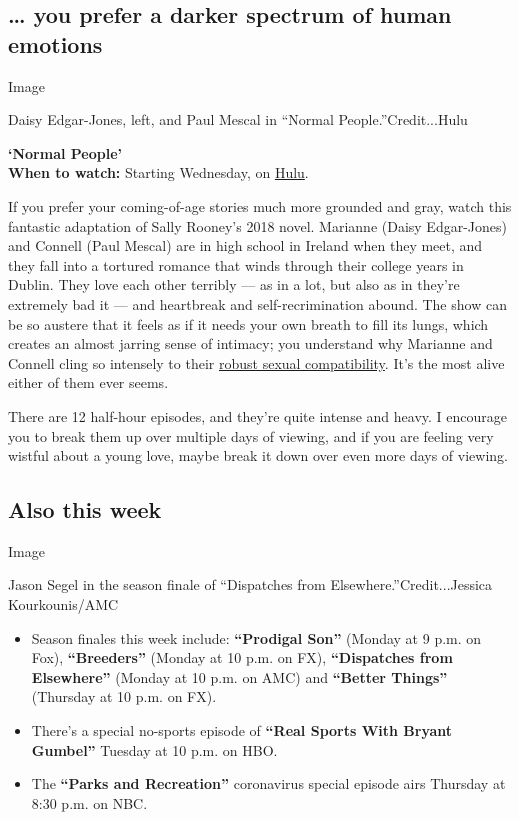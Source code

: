 \hypertarget{-you-prefer-a-darker-spectrum-of-human-emotions}{%
\subsection{\ldots{} you prefer a darker spectrum of human
emotions}\label{-you-prefer-a-darker-spectrum-of-human-emotions}}

Image

Daisy Edgar-Jones, left, and Paul Mescal in ``Normal
People.''Credit...Hulu

\textbf{`Normal People'}\\
\textbf{When to watch:} Starting Wednesday, on
\href{https://www.hulu.com/series/normal-people-57048262-2ca5-41ee-9b57-53bb9b9e1596}{Hulu}.

If you prefer your coming-of-age stories much more grounded and gray,
watch this fantastic adaptation of Sally Rooney's 2018 novel. Marianne
(Daisy Edgar-Jones) and Connell (Paul Mescal) are in high school in
Ireland when they meet, and they fall into a tortured romance that winds
through their college years in Dublin. They love each other terribly ---
as in a lot, but also as in they're extremely bad it --- and heartbreak
and self-recrimination abound. The show can be so austere that it feels
as if it needs your own breath to fill its lungs, which creates an
almost jarring sense of intimacy; you understand why Marianne and
Connell cling so intensely to their
\href{https://www.nytimes.com/2020/04/17/arts/television/normal-people-hulu.html}{robust
sexual compatibility}. It's the most alive either of them ever seems.

There are 12 half-hour episodes, and they're quite intense and heavy. I
encourage you to break them up over multiple days of viewing, and if you
are feeling very wistful about a young love, maybe break it down over
even more days of viewing.

\hypertarget{also-this-week}{%
\subsection{Also this week}\label{also-this-week}}

Image

Jason Segel in the season finale of ``Dispatches from
Elsewhere.''Credit...Jessica Kourkounis/AMC

\begin{itemize}
\item
  Season finales this week include: \textbf{``Prodigal Son''} (Monday at
  9 p.m. on Fox), \textbf{``Breeders''} (Monday at 10 p.m. on FX),
  \textbf{``Dispatches from Elsewhere''} (Monday at 10 p.m. on AMC) and
  \textbf{``Better Things''} (Thursday at 10 p.m. on FX).
\item
  There's a special no-sports episode of \textbf{``Real Sports With
  Bryant Gumbel''} Tuesday at 10 p.m. on HBO.
\item
  The \textbf{``Parks and Recreation''} coronavirus special episode airs
  Thursday at 8:30 p.m. on NBC.
\end{itemize}

